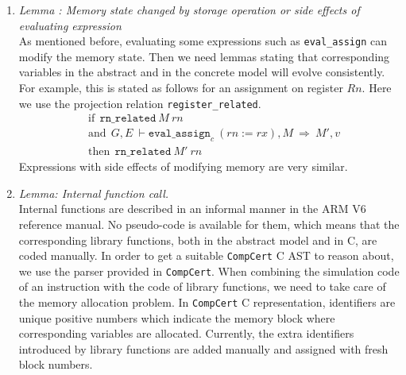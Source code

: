 \documentclass[twocolumn]{article}
\newcommand{\compcert}{\texttt{CompCert}\xspace}
\begin{document}
\begin{enumerate}
To evaluate the value of simple expressions, \compcert provides two
other big-step relations \texttt{eval\_simple\_rvalue} and
\texttt{eval\_simple\_lvalue} for evaluating respectively their left
and right values.  The rules have the following shape:
\[
\dfrac{
\begin{array}{l}
G,E~\vdash a_1,M\Rightarrow v_1 \quad G,E~\vdash a_2,M\Rightarrow v_2\\
\texttt{sem\_binary\_operation}(op,v_1,v_2,M)~=~v
\end{array}}
{G,E~\vdash (a_1~op~a_2),M\Rightarrow v}
\]
In order to evaluate the binary expression $a_1~op~a_2$,
the sub-expressions $a_1$ and $a_2$ are first evaluated,
and their respective results $v_1$ and $v_2$ are used
to compute the final result $v$.
\item
  {\it Lemma : Memory state changed by storage operation or side effects of evaluating expression}\\
  As mentioned before, evaluating some expressions such as
  \texttt{eval\_assign} can modify the memory state.  Then we need
  lemmas stating that corresponding variables in the abstract and in
  the concrete model will evolve consistently.  For example, this is
  stated as follows for an assignment on register $Rn$.  Here we use
  the projection relation \texttt{register\_related}.
\begin{align*}
&\textrm{if} ~~ \texttt{rn\_related}~M~rn\\
&\textrm{and}~~  G,E~\vdash \texttt{eval\_assign}_c~(rn:=rx),M~\Rightarrow~ M',v\\
&\textrm{then} ~~ \texttt{rn\_related}~M'~rn
\end{align*}
Expressions with side effects of modifying memory are very similar.
\item
  \textit{Lemma: Internal function call.}\\
  Internal functions are described in an informal manner in the ARM V6
  reference manual.  No pseudo-code is available for them, which means
  that the corresponding library functions, both in the abstract model
  and in C, are coded manually.  In order to get a suitable
  \compcert C AST to reason about, we use the parser provided in
  \compcert.  When combining the simulation code of an instruction
  with the code of library functions, we need to take care of the
  memory allocation problem.  In \compcert C representation,
  identifiers are unique positive numbers which indicate the memory
  block where corresponding variables are allocated.  Currently, the
  extra identifiers introduced by library functions are added manually
  and assigned with fresh block numbers.
\label{page:libfunast}


\end{enumerate}
\end{document}
